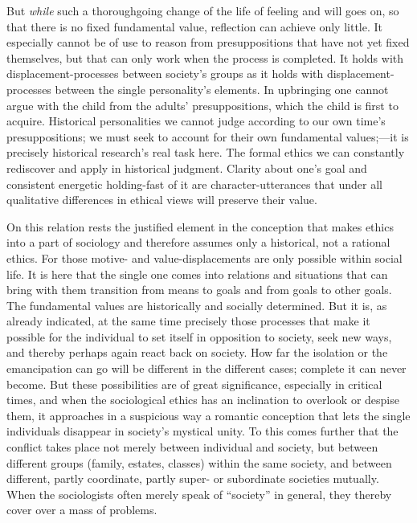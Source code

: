 \documentclass[12pt,a4paper]{book}
\newcommand{\opage}[1]{\marginnote{\footnotesize\textit{[#1]}}}
\begin{document}
But \emph{while} such a thoroughgoing change of the life of feeling and will goes on, so that there is no fixed
fundamental value, reflection can achieve only little. It especially cannot be of use to reason from
presuppositions that have not yet fixed themselves, but that can only work when the process is completed. It
holds with displacement-processes between society's groups as it holds with displacement-processes between the
single personality's elements. In upbringing one cannot argue with the child from the adults' presuppositions,
which the child is first to acquire. Historical personalities we cannot judge according to our own time's
presuppositions; we must seek to account for their own fundamental values;---it is precisely historical research's
real task here. The formal ethics we can constantly rediscover and apply in historical judgment. Clarity about
one's goal and consistent energetic holding-fast of it are character-utterances that under all qualitative
differences in ethical views will preserve their value.

On this relation rests the justified element in the conception that makes ethics into a part of sociology and
therefore assumes only a historical, not a rational ethics. For those motive- and value-displacements are only
possible within social life. It is here that the single one comes into relations and situations that can bring
with them transition from means to goals and from goals to other goals. The fundamental values are historically
and socially determined. But it is, as already indicated, at the same time precisely those processes that make it
possible for the individual to set itself in opposition to society, seek new ways, and thereby perhaps again react
back on society. How far the isolation or the emancipation can go will be different in the \opage{363}different cases;
complete it can never become. But these possibilities are of great significance, especially in critical times, and
when the sociological ethics has an inclination to overlook or despise them, it approaches in a suspicious way a
romantic conception that lets the single individuals disappear in society's mystical unity. To this comes further
that the conflict takes place not merely between individual and society, but between different groups (family,
estates, classes) within the same society, and between different, partly coordinate, partly super- or subordinate
societies mutually. When the sociologists often merely speak of ``society'' in general, they thereby cover over a
mass of problems.
\end{document}
